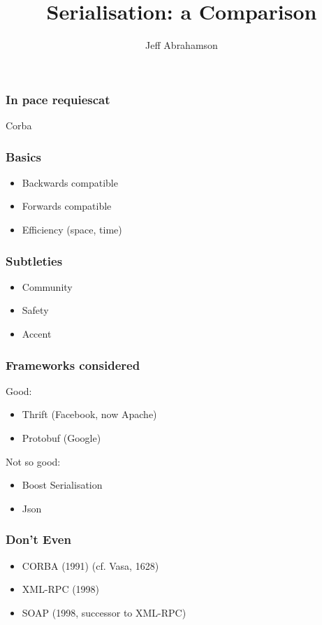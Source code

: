 \documentclass[t]{beamer}
\title
{Serialisation: a Comparison}
\author[Abrahamson] {Jeff Abrahamson}\institute{Jellybooks}
\date[21 September 2015]
\newcommand\solo[1]{\centerline{#1}}
\begin{document}
\begin{frame}
  \titlepage
\end{frame}

\begin{frame}
  \frametitle{In pace requiescat}

  \vfill
  \solo{Corba}
\end{frame}

\begin{frame}
  \frametitle{Basics}

  \begin{itemize}
  \item Backwards compatible
  \item Forwards compatible
  \item Efficiency (space, time)
  \end{itemize}
\end{frame}

\begin{frame}
  \frametitle{Subtleties}

  \begin{itemize}
  \item Community
  \item Safety
  \item Accent
  \end{itemize}
\end{frame}

\begin{frame}
  \frametitle{Frameworks considered}

  Good:
  \begin{itemize}
  \item Thrift (Facebook, now Apache)
  \item Protobuf (Google)
  \end{itemize}

  Not so good:
  \begin{itemize}
  \item Boost Serialisation
  \item Json
  \end{itemize}

\end{frame}

\begin{frame}
  \frametitle{Don't Even}

  \begin{itemize}
  \item CORBA (1991) (cf. Vasa, 1628)
  \item XML-RPC (1998)
  \item SOAP (1998, successor to XML-RPC)
  \end{itemize}
\end{frame}
\end{document}
